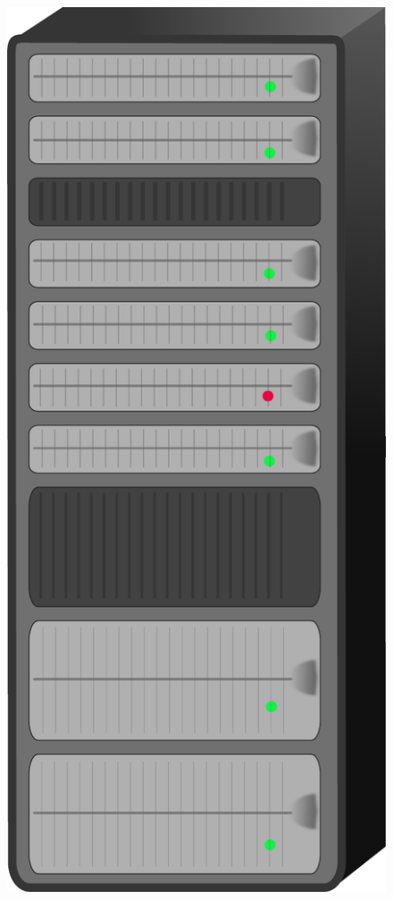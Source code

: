 \documentclass[aspectratio=169]{beamer}
\begin{document}
\begin{frame}
\begin{columns}
\begin{figure}
      \includegraphics[scale=0.10]{images/server.pdf}

\end{figure}
\end{columns}
\end{frame}
\end{document}

